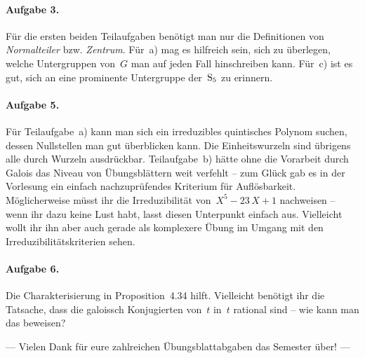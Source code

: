 \documentclass{../algblatt}
\begin{document}
\paragraph{Aufgabe 3.} Für die ersten beiden Teilaufgaben benötigt man nur die
Definitionen von \emph{Normalteiler} bzw. \emph{Zentrum}. Für~a) mag es
hilfreich sein, sich zu überlegen, welche Untergruppen von~$G$ man auf jeden
Fall hinschreiben kann. Für~c) ist es gut, sich an eine prominente
Untergruppe der~$\mathrm{S}_5$ zu erinnern.

\paragraph{Aufgabe 5.} Für Teilaufgabe~a) kann man sich ein
irreduzibles quintisches Polynom suchen, dessen Nullstellen man gut überblicken
kann. Die Einheitswurzeln sind übrigens alle durch Wurzeln ausdrückbar.
Teilaufgabe~b) hätte
ohne die Vorarbeit durch Galois das Niveau von Übungsblättern weit verfehlt --
zum Glück gab es in der Vorlesung ein einfach nachzuprüfendes Kriterium für
Auflösbarkeit. Möglicherweise müsst ihr die Irreduzibilität von~$X^5-23\,X+1$
nachweisen -- wenn ihr dazu keine Lust habt, lasst diesen Unterpunkt einfach
aus. Vielleicht wollt ihr ihn aber auch gerade als komplexere Übung im
Umgang mit den Irreduzibilitätskriterien sehen.

\paragraph{Aufgabe 6.} Die Charakterisierung in Proposition~4.34 hilft.
Vielleicht benötigt ihr die Tatsache, dass die galoissch Konjugierten von~$t$
in~$t$ rational sind -- wie kann man das beweisen?

\begin{center}
--- Vielen Dank für eure zahlreichen Übungsblattabgaben das Semester über! ---
\end{center}
\end{document}
